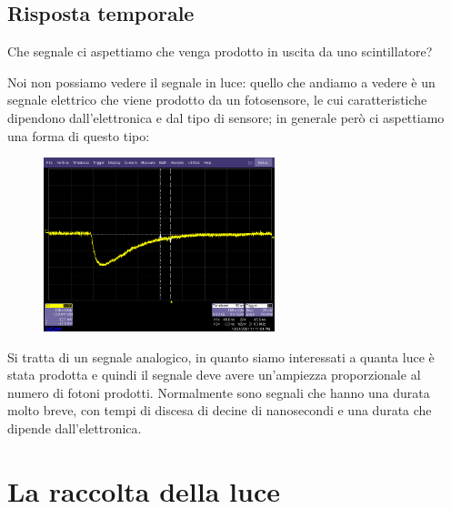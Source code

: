 \subsection{Risposta temporale}
Che segnale ci aspettiamo che venga prodotto in uscita da uno scintillatore?

Noi non possiamo vedere il segnale in luce: quello che andiamo a vedere è un segnale elettrico che viene prodotto da un fotosensore, le cui caratteristiche dipendono dall'elettronica e dal tipo di sensore; in generale però ci aspettiamo una forma di questo tipo:
\begin{figure}[H]
   \centering
   \includegraphics[width=0.6\textwidth]{immagini/segnale_scintillatore.png}
\end{figure}
Si tratta di un segnale analogico, in quanto siamo interessati a quanta luce è stata prodotta e quindi il segnale deve avere un'ampiezza proporzionale al numero di fotoni prodotti. Normalmente sono segnali che hanno una durata molto breve, con tempi di discesa di decine di nanosecondi e una durata che dipende dall'elettronica.

\section{La raccolta della luce}

